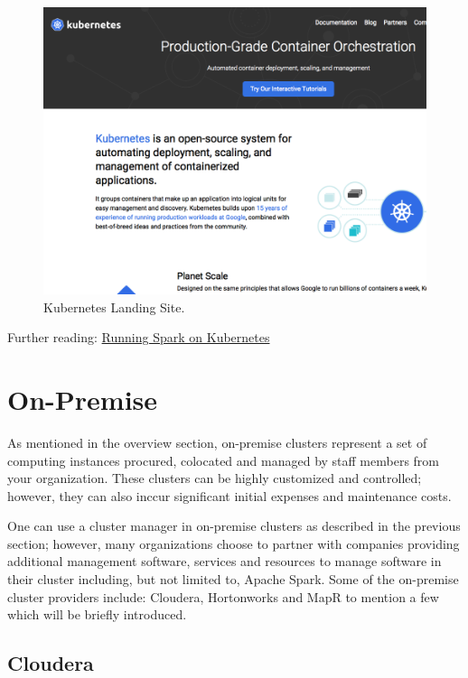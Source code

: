 \documentclass[]{book}
\theoremstyle{definition}
\theoremstyle{definition}
\theoremstyle{definition}
\theoremstyle{remark}
\begin{document}
\begin{figure}

{\centering \includegraphics[width=13.78in]{images/05-clusters-kubernetes} 

}

\caption{Kubernetes Landing Site.}\label{fig:kubernetes-spark}
\end{figure}

Further reading:
\href{https://spark.apache.org/docs/latest/running-on-kubernetes.html}{Running
Spark on Kubernetes}

\hypertarget{on-premise}{%
\section{On-Premise}\label{on-premise}}

As mentioned in the overview section, on-premise clusters represent a
set of computing instances procured, colocated and managed by staff
members from your organization. These clusters can be highly customized
and controlled; however, they can also inccur significant initial
expenses and maintenance costs.

One can use a cluster manager in on-premise clusters as described in the
previous section; however, many organizations choose to partner with
companies providing additional management software, services and
resources to manage software in their cluster including, but not limited
to, Apache Spark. Some of the on-premise cluster providers include:
Cloudera, Hortonworks and MapR to mention a few which will be briefly
introduced.

\hypertarget{cloudera}{%
\subsection{Cloudera}\label{cloudera}}
\end{document}
